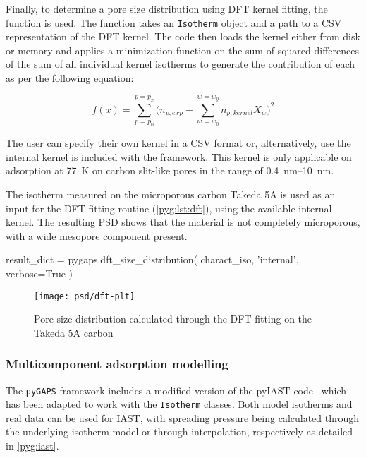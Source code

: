 Finally, to determine a pore size distribution using DFT kernel fitting,
the  function is used. 
The function takes an \texttt{Isotherm} object and a path
to a CSV representation of the DFT kernel. The code then
loads the kernel either from disk or memory and 
applies a minimization function on the sum of squared differences
of the sum of all individual kernel isotherms to generate 
the contribution of each as per the following equation:

\begin{equation}
	f(x) = \sum_{p=p_0}^{p=p_x} \Big(n_{p,exp} - \sum_{w=w_0}^{w=w_y} n_{p, kernel} X_w \Big)^2
\end{equation}

The user can specify their own kernel in a CSV format or, alternatively,
use the internal kernel is included with the framework. This kernel
is only applicable on  adsorption at \SI{77}{\kelvin} on 
carbon slit-like pores in the range of \SIrange{0.4}{10}{\nano\meter}.

The isotherm measured on the microporous carbon Takeda 5A is used as 
an input for the DFT fitting routine (\autoref{pyg:lst:dft}), using the
available internal kernel. The resulting PSD shows that the material
is not completely microporous, with a wide mesopore component
present.

\begin{python}[caption={DFT size distribution in pyGAPS},%
    label={pyg:lst:dft}]
result_dict = pygaps.dft_size_distribution(
    charact_iso,
    'internal',
    verbose=True
)
\end{python}
\begin{figure}[!htb]
	\texttt{[image: psd/dft-plt]}
	\caption{Pore size distribution calculated through the DFT fitting on the Takeda 5A carbon}%
	\label{fig:pyg:fig:dft}
\end{figure}

\subsubsection{Multicomponent adsorption modelling}

The \texttt{pyGAPS} framework includes a modified version of 
the pyIAST code~\cite{simonPyIASTIdealAdsorbed2016} which has 
been adapted to work with the \texttt{Isotherm} 
classes. Both model isotherms and real data can be used for 
IAST, with spreading pressure being calculated through the 
underlying isotherm model or through interpolation, respectively
as detailed in \autoref{pyg:iast}.

